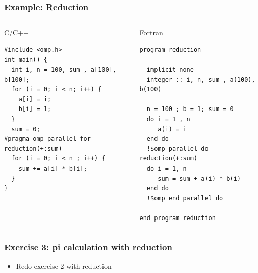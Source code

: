 \documentclass[10pt,t]{beamer}
\begin{document}
\begin{frame}[fragile]
  \frametitle{Example: Reduction}
  \begin{columns}
    \begin{exampleblock}{C/C++}
      {\tiny
        \begin{lstlisting}[basicstyle=\footnotesize\ttfamily,language=OmpC]
#include <omp.h>
int main() {
  int i, n = 100, sum , a[100], b[100];
  for (i = 0; i < n; i++) {
    a[i] = i;
    b[i] = 1;
  }
  sum = 0;
#pragma omp parallel for reduction(+:sum)
  for (i = 0; i < n ; i++) {
    sum += a[i] * b[i];
  }
}
        \end{lstlisting}
      }
    \end{exampleblock}
    \begin{exampleblock}{Fortran}
      {\tiny
        \begin{lstlisting}[basicstyle=\footnotesize\ttfamily,language=OmpFortran]
program reduction
  
  implicit none
  integer :: i, n, sum , a(100), b(100)

  n = 100 ; b = 1; sum = 0
  do i = 1 , n
     a(i) = i
  end do
  !$omp parallel do reduction(+:sum)
  do i = 1, n
     sum = sum + a(i) * b(i)
  end do
  !$omp end parallel do

end program reduction
        \end{lstlisting}
      }
    \end{exampleblock}
  \end{columns}
\end{frame}

\begin{frame}
  \frametitle{Exercise 3: pi calculation with reduction}
  \begin{itemize}
    \item Redo exercise 2 with reduction
  \end{itemize}
\end{frame}
\end{document}
